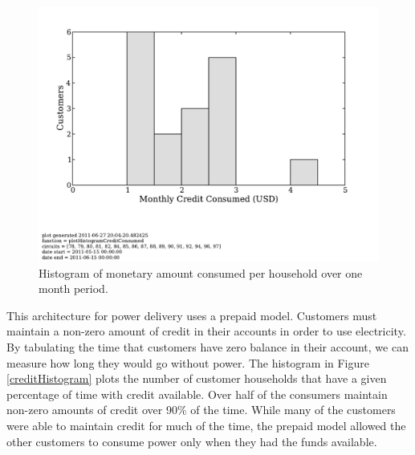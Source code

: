 \documentclass{sig-alternate}
\begin{document}
\begin{figure}[]
\begin{center}
\includegraphics[trim = 0in 1.3in 0in 0in, clip, width=\columnwidth]
                {figures/consumptionHistogram.pdf}
\end{center}
\caption{Histogram of monetary amount consumed per household over one month period.}
\label{consumptionHistogram}
\end{figure}



This architecture for power delivery uses a prepaid model.
Customers must maintain a non-zero amount of credit in their accounts in order
to use electricity.
By tabulating the time that customers have zero balance in their account, we can
measure how long they would go without power.
The histogram in Figure \ref{creditHistogram} plots the number of customer households
that have a given percentage of time with credit available.
Over half of the consumers maintain non-zero amounts of credit over 90\% of
the time.
While many of the customers were able to maintain credit for much of the 
time, the prepaid model allowed the other customers to consume power only
when they had the funds available.
\end{document}
